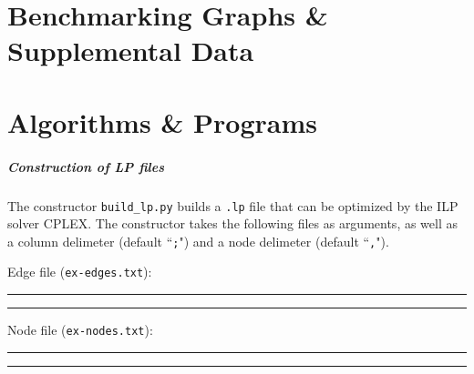 \documentclass[12pt,twoside]{reedthesis}
\theoremstyle{definition}
\begin{document}
    \appendix
      \chapter{Benchmarking Graphs \& Supplemental Data}

      \chapter{Algorithms \& Programs}

        \paragraph{Construction of LP files}The constructor \verb|build_lp.py| builds a \texttt{.lp} file that can be optimized by the ILP solver CPLEX. The constructor takes the following files as arguments, as well as a column delimeter (default ``\texttt{;}") and a node delimeter (default ``\texttt{,}").

        Edge file (\texttt{ex-edges.txt}):\\
        \rule{\textwidth}{1pt}
        
        \rule{\textwidth}{1pt}

        \newpage

        Node file (\texttt{ex-nodes.txt}):\\
        \rule{\textwidth}{1pt}
        
        \rule{\textwidth}{1pt}

        \newpage
\end{document}
